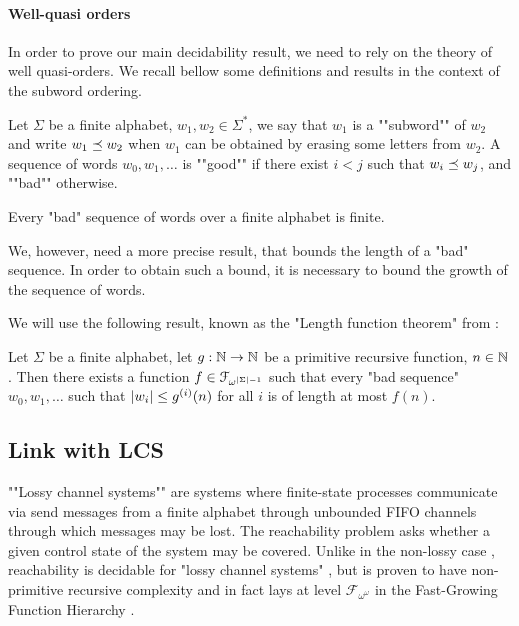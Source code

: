 \paragraph*{Well-quasi orders}

In order to prove our main decidability result, we need to rely on the theory of well quasi-orders. We recall bellow some definitions and results in the context of the subword ordering.

Let $\Sigma$ be a finite alphabet, $w_1, w_2 \in \Sigma^*$, we say that $w_1$ is a ""subword"" of $w_2$ and write $w_1 \preceq w_2$ when $w_1$ can be obtained by erasing some letters from $w_2$. 
A sequence of words $w_0, w_1, \ldots$ is ""good"" if there exist $i<j$ such that $w_i \preceq w_j$, and ""bad"" otherwise. 

\begin{lemma}
	Every "bad" sequence of  words over a finite alphabet is finite.
\end{lemma}

We, however, need a more precise result, that bounds the length of a "bad" sequence. In order to obtain such a bound, it is necessary to bound the growth of the sequence of words. 
 
We will use the following result, known as the "Length function theorem" from \cite{SchmitzS2011upperHigman}:

\begin{theorem}
	\label{lem:lengthfcttheorem}
	Let $\Sigma$ be a finite alphabet, let $g : \mathbb{N} \to \mathbb{N}$ be a primitive recursive function, $n\in \mathbb{N}$.
	Then there exists a function $f \in \mathcal{F}_{\omega^{|\Sigma| - 1}}$ such that every "bad sequence" $w_0, w_1, \ldots$ such that $|w_i| \leq g^{(i)}(n)$ for all $i$ is of length at most $f(n)$. 
\end{theorem}



\subsection{Link with LCS}


""Lossy channel systems""  are systems where finite-state processes communicate via send messages from a finite alphabet through unbounded FIFO channels through which messages may be lost. The reachability problem asks whether a given control state of the system may be covered. Unlike in the non-lossy case \cite{BZ83}, reachability is decidable for "lossy channel systems" \cite{AK95,AbdullaJ1996undec}, but is proven to have non-primitive recursive complexity \cite{Schnoebelen2002verifying} and in fact lays at level $\mathcal{F}_{\omega^{\omega}}$ in the Fast-Growing Function Hierarchy \cite{ChambartS2008ordinal}.

